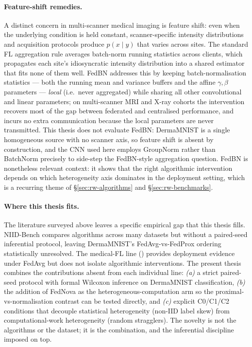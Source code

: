 \documentclass[11pt,a4paper]{article}
\begin{document}
\paragraph{Feature-shift remedies.}
A distinct concern in multi-scanner medical imaging is feature shift: even
when the underlying condition is held constant, scanner-specific intensity
distributions and acquisition protocols produce $p(x \mid y)$ that varies
across sites. The standard FL aggregation rule averages batch-norm running
statistics across clients, which propagates each site's idiosyncratic
intensity distribution into a shared estimator that fits none of them well.
FedBN \citep{li2021fedbn} addresses this by keeping batch-normalisation
statistics --- both the running mean and variance buffers and the affine
$\gamma, \beta$ parameters --- \emph{local} (i.e.\ never aggregated) while
sharing all other convolutional and linear parameters; on multi-scanner MRI
and X-ray cohorts the intervention recovers most of the gap between
federated and centralised performance, and incurs no extra communication
because the local parameters are never transmitted. This thesis does not
evaluate FedBN: DermaMNIST is a single homogeneous source with no scanner
axis, so feature shift is absent by construction, and the CNN used here
employs GroupNorm \citep{wu2018groupnorm} rather than BatchNorm precisely
to side-step the FedBN-style aggregation question. FedBN is nonetheless
relevant context: it shows that the right algorithmic intervention depends
on which heterogeneity axis dominates in the deployment setting, which is
a recurring theme of \S\ref{sec:rw-algorithms} and
\S\ref{sec:rw-benchmarks}.

\paragraph{Where this thesis fits.}
The literature surveyed above leaves a specific empirical gap that this
thesis fills. NIID-Bench compares algorithms across many datasets but
without a paired-seed inferential protocol, leaving DermaMNIST's
FedAvg-vs-FedProx ordering statistically unresolved. The medical-FL line
(\citealt{sheller2020medicalfl, rieke2020future, pati2022fets}) provides
deployment evidence under FedAvg but does not isolate algorithmic
interventions. The present thesis combines the contributions absent
from each individual line: \emph{(a)} a strict paired-seed protocol with
formal Wilcoxon inference on DermaMNIST classification, \emph{(b)} the
addition of FedNova as the heterogeneous-computation arm so the
proximal-vs-normalisation contrast can be tested directly, and \emph{(c)}
explicit C0/C1/C2 conditions that decouple statistical heterogeneity
(non-IID label skew) from computational-work heterogeneity (random
stragglers). The novelty is not the algorithms or the dataset; it is the
combination, and the inferential discipline imposed on top.
\end{document}
